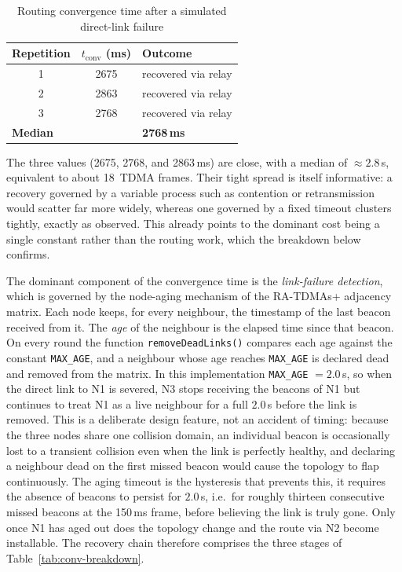 \vspace{0.4cm}
\begin{table}[h]
\centering
\caption{Routing convergence time after a simulated direct-link failure}
\label{tab:convergence}
\begin{tabular}{ccl}
\toprule
\textbf{Repetition} & \textbf{$t_{\mathrm{conv}}$ (ms)} & \textbf{Outcome} \\
\midrule
1 & 2675 & recovered via relay \\
2 & 2863 & recovered via relay \\
3 & 2768 & recovered via relay \\
\midrule
\multicolumn{2}{l}{\textbf{Median}} & \textbf{2768\,ms} \\
\bottomrule
\end{tabular}
\end{table}
\vspace{0.5cm}

The three values (2675, 2768, and 2863\,ms) are close, with a median of
$\approx 2.8$\,s, equivalent to about 18~TDMA frames. Their tight spread is
itself informative: a recovery governed by a variable process such as contention
or retransmission would scatter far more widely, whereas one governed by a fixed
timeout clusters tightly, exactly as observed. This already points to the
dominant cost being a single constant rather than the routing work, which the
breakdown below confirms.

The dominant component of the convergence time is the \emph{link-failure
detection}, which is governed by the node-aging mechanism of the RA-TDMAs+
adjacency matrix. Each node keeps, for every neighbour, the timestamp of the
last beacon received from it. The \emph{age} of the neighbour is the elapsed time
since that beacon. On every round the function \texttt{removeDeadLinks()}
compares each age against the constant \texttt{MAX\_AGE}, and a neighbour whose
age reaches \texttt{MAX\_AGE} is declared dead and removed from the matrix. In
this implementation \texttt{MAX\_AGE} $= 2.0$\,s, so when the direct link to N1
is severed, N3 stops receiving the beacons of N1 but continues to treat N1 as a live
neighbour for a full $2.0$\,s before the link is removed. This is a deliberate
design feature, not an accident of timing: because the three nodes share one
collision domain, an individual beacon is occasionally lost to a transient
collision even when the link is perfectly healthy, and declaring a neighbour
dead on the first missed beacon would cause the topology to flap continuously.
The aging timeout is the hysteresis that prevents this, it requires the
absence of beacons to persist for $2.0$\,s, i.e.\ for roughly thirteen
consecutive missed beacons at the 150\,ms frame, before believing the link is
truly gone. Only once N1 has aged out does the topology change and the route via
N2 become installable. The recovery chain therefore comprises the three stages
of Table~\ref{tab:conv-breakdown}.

